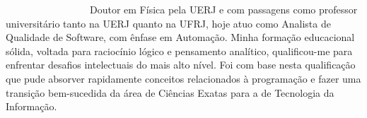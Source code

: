 \documentclass[9pt]{developercv} %
\begin{document}

\ \ \ \ \ \ \ \ \ \ \ \ \ \ \ \ \ Doutor em Física pela UERJ e com passagens como professor universitário tanto na UERJ quanto na UFRJ, hoje atuo como Analista de Qualidade de Software, com ênfase em Automação. Minha formação educacional sólida, voltada para raciocínio lógico e pensamento analítico, qualificou-me para enfrentar desafios intelectuais do mais alto nível. Foi com base nesta qualificação que pude absorver rapidamente conceitos relacionados à programação e fazer uma transição bem-sucedida da área de Ciências Exatas para a de Tecnologia da Informação.

\end{document}
